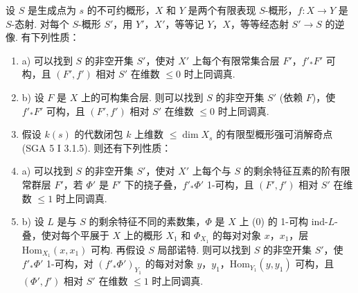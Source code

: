 \begin{theorem}\label{thm:XIII.3.1}
设 $S$ 是生成点为 $s$ 的不可约概形，$X$ 和 $Y$ 是两个有限表现 $S$-概形，$f \colon X \to Y$ 是 $S$-态射. 对每个 $S$-概形 $S'$，用 $Y'$，$X'$，等等记 $Y$，$X$，等等经态射 $S' \to S$ 的逆像. 有下列性质：
\begin{enumerate}[1)]
\item a) 可以找到 $S$ 的非空开集 $S'$，使对 $X'$ 上每个有限常集合层 $F'$，$f'_* F'$ 可构，且 $(F', f')$ 相对 $S'$ 在维数 $\leqslant 0$ 时上同调真.
\item b) 设 $F$ 是 $X$ 上的可构集合层. 则可以找到 $S$ 的非空开集 $S'$ (依赖 $F$)，使 $f'_* F'$ 可构，且 $(F', f')$ 相对 $S'$ 在维数 $\leqslant 0$ 时上同调真.
\item 假设 $k(s)$ 的代数闭包 $k$ 上维数 $\leqslant \dim X_s$ 的有限型概形强可消解奇点 (SGA 5 I 3.1.5). 则还有下列性质：
\item a) 可以找到 $S$ 的非空开集 $S'$，使对 $X'$ 上每个与 $S$ 的剩余特征互素的阶有限常群层 $F'$，若 $\Phi'$ 是 $F'$ 下的挠子叠，$f'_* \Phi'$ 1-可构，且 $(F', f')$ 相对 $S'$ 在维数 $\leqslant 1$ 时上同调真.
\item b) 设 $L$ 是与 $S$ 的剩余特征不同的素数集，$\Phi$ 是 $X$ 上 (0) 的 1-可构 ind-$L$-叠，使对每个平展于 $X$ 上的概形 $X_1$ 和 $\Phi_{X_1}$ 的每对对象 $x$，$x_1$，层 $\mathrm{Hom}_{X_1}(x, x_1)$ 可构. 再假设 $S$ 局部诺特. 则可以找到 $S$ 的非空开集 $S'$，使 $f'_* \Phi'$ 1-可构，对 $(f'_* \Phi')_{Y_1}$ 的每对对象 $y$，$y_1$，$\mathrm{Hom}_{Y_1}(y, y_1)$ 可构，且 $(\Phi', f')$ 相对 $S'$ 在维数 $\leqslant 1$ 时上同调真.
\end{enumerate}
\end{theorem}

